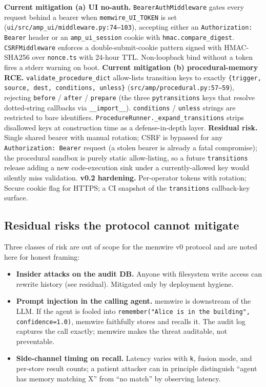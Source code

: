 \documentclass[11pt,letterpaper,twocolumn]{article}
\begin{document}
\textbf{Current mitigation (a) UI no-auth.} \texttt{BearerAuthMiddleware} gates every request behind a bearer when \texttt{memwire\_UI\_TOKEN} is set (\texttt{ui/src/amp\_ui/middleware.py:74--103}), accepting either an \texttt{Authorization: Bearer} header or an \texttt{amp\_ui\_session} cookie with \texttt{hmac.compare\_digest}. \texttt{CSRFMiddleware} enforces a double-submit-cookie pattern signed with HMAC-SHA256 over \texttt{nonce.ts} with 24-hour TTL. Non-loopback bind without a token fires a stderr warning on boot. \textbf{Current mitigation (b) procedural-memory RCE.} \texttt{validate\_procedure\_dict} allow-lists transition keys to exactly \texttt{\{trigger, source, dest, conditions, unless\}} (\texttt{src/amp/procedural.py:57--59}), rejecting \texttt{before} / \texttt{after} / \texttt{prepare} (the three \texttt{pytransitions} keys that resolve dotted-string callbacks via \texttt{\_\_import\_\_}). \texttt{conditions} / \texttt{unless} strings are restricted to bare identifiers. \texttt{ProcedureRunner.\_expand\_transitions} strips disallowed keys at construction time as a defense-in-depth layer. \textbf{Residual risk.} Single shared bearer with manual rotation; CSRF is bypassed for any \texttt{Authorization: Bearer} request (a stolen bearer is already a fatal compromise); the procedural sandbox is purely static allow-listing, so a future \texttt{transitions} release adding a new code-execution sink under a currently-allowed key would silently miss validation. \textbf{v0.2 hardening.} Per-operator tokens with rotation; Secure cookie flag for HTTPS; a CI snapshot of the \texttt{transitions} callback-key surface.

\subsection{Residual risks the protocol cannot mitigate}
\label{sec:threats-residual}

Three classes of risk are out of scope for the memwire v0 protocol and are noted here for honest framing:

\begin{itemize}[leftmargin=*]
  \item \textbf{Insider attacks on the audit DB.} Anyone with filesystem write access can rewrite history (see  residual). Mitigated only by deployment hygiene.
  \item \textbf{Prompt injection in the calling agent.} memwire is downstream of the LLM. If the agent is fooled into \texttt{remember("Alice is in the building", confidence=1.0)}, memwire faithfully stores and recalls it. The audit log captures the call exactly; memwire makes the threat auditable, not preventable.
  \item \textbf{Side-channel timing on recall.} Latency varies with \texttt{k}, fusion mode, and per-store result counts; a patient attacker can in principle distinguish ``agent has memory matching X'' from ``no match'' by observing latency.
\end{itemize}
\end{document}

